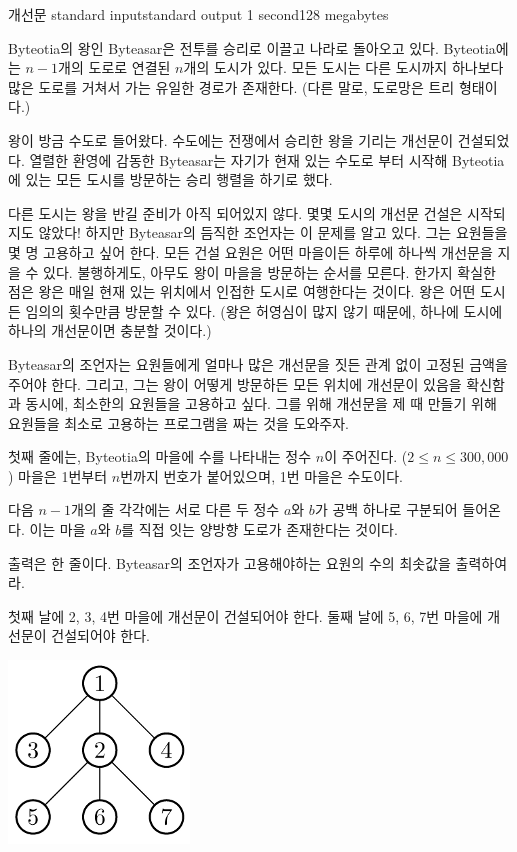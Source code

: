 \begin{problem}{개선문}
	{standard input}{standard output}
	{1 second}{128 megabytes}{}
	
	
	Byteotia의 왕인 Byteasar은 전투를 승리로 이끌고 나라로 돌아오고 있다. Byteotia에는 $n-1$개의 도로로 연결된 $n$개의 도시가 있다. 모든 도시는 다른 도시까지 하나보다 많은 도로를 거쳐서 가는 유일한 경로가 존재한다. (다른 말로, 도로망은 트리 형태이다.)
	
	왕이 방금 수도로 들어왔다. 수도에는 전쟁에서 승리한 왕을 기리는 개선문이 건설되었다. 열렬한 환영에 감동한 Byteasar는 자기가 현재 있는 수도로 부터 시작해 Byteotia에 있는 모든 도시를 방문하는 승리 행렬을 하기로 했다.

	다른 도시는 왕을 반길 준비가 아직 되어있지 않다. 몇몇 도시의 개선문 건설은 시작되지도 않았다! 하지만 Byteasar의 듬직한 조언자는 이 문제를 알고 있다. 그는 요원들을 몇 명 고용하고 싶어 한다. 모든 건설 요원은 어떤 마을이든 하루에 하나씩 개선문을 지을 수 있다. 불행하게도, 아무도 왕이 마을을 방문하는 순서를 모른다. 한가지 확실한 점은 왕은 매일 현재 있는 위치에서 인접한 도시로 여행한다는 것이다. 왕은 어떤 도시든 임의의 횟수만큼 방문할 수 있다. (왕은 허영심이 많지 않기 때문에, 하나에 도시에 하나의 개선문이면 충분할 것이다.)
	
	Byteasar의 조언자는 요원들에게 얼마나 많은 개선문을 짓든 관계 없이 고정된 금액을 주어야 한다. 그리고, 그는 왕이 어떻게 방문하든 모든 위치에 개선문이 있음을 확신함과 동시에, 최소한의 요원들을 고용하고 싶다. 그를 위해 개선문을 제 때 만들기 위해 요원들을 최소로 고용하는 프로그램을 짜는 것을 도와주자.
	
	

	\InputFile
	
	첫째 줄에는, Byteotia의 마을에 수를 나타내는 정수 $n$이 주어진다. ($2 \le n \le 300,000$) 마을은 1번부터 $n$번까지 번호가 붙어있으며, 1번 마을은 수도이다.
	
	다음 $n-1$개의 줄 각각에는 서로 다른 두 정수 $a$와 $b$가 공백 하나로 구분되어 들어온다. 이는 마을 $a$와 $b$를 직접 잇는 양방향 도로가 존재한다는 것이다.
	
	\OutputFile
	
	출력은 한 줄이다. Byteasar의 조언자가 고용해야하는 요원의 수의 최솟값을 출력하여라.
	
	 
	\Examples
		
	\begin{example}
	\end{example}
    
    첫째 날에 2, 3, 4번 마을에 개선문이 건설되어야 한다. 둘째 날에 5, 6, 7번 마을에 개선문이 건설되어야 한다.
    
    \begin{center}
    	\includegraphics[width=0.23\linewidth]{luk.png}
    \end{center}
        
\end{problem}

